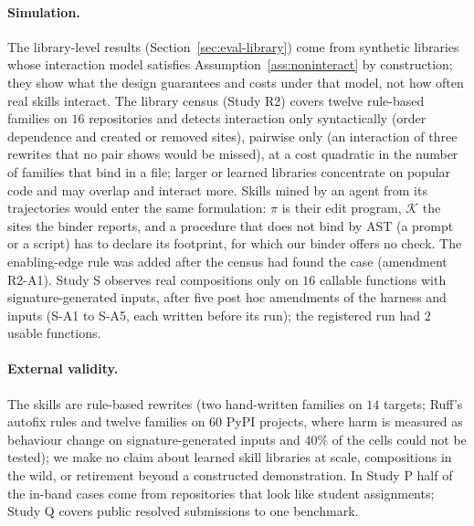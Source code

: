 \paragraph{Simulation.}
The library-level results (Section~\ref{sec:eval-library}) come from synthetic libraries whose interaction model satisfies
Assumption~\ref{ass:noninteract} by construction; they show what the design guarantees and costs under that model, not how often real
skills interact.  The library census (Study R2) covers twelve rule-based families on $16$ repositories and detects interaction only
syntactically (order dependence and created or removed sites), pairwise only (an interaction of three rewrites that no pair shows would be
missed), at a cost quadratic in the number of families that bind in a file; larger or learned libraries concentrate on popular code
and may overlap and interact more.  Skills mined by an agent from its trajectories would enter the same formulation: $\pi$ is
their edit program, $\mathcal{K}$ the sites the binder reports, and a procedure that does not bind by AST (a prompt or a script)
has to declare its footprint, for which our binder offers no check.  The enabling-edge rule was added after the census had found the case (amendment R2-A1).  Study S observes real compositions only
on $16$ callable functions with signature-generated inputs, after five post hoc amendments of the harness and inputs
(S-A1 to S-A5, each written before its run); the registered run had $2$ usable functions.

\paragraph{External validity.}
The skills are rule-based rewrites (two hand-written families on $14$ targets; Ruff's autofix rules and twelve families on $60$
PyPI projects, where harm is measured as behaviour change on signature-generated inputs and $40\%$ of the cells could not be
tested); we make no claim about learned skill libraries at scale,
compositions in the wild, or retirement beyond a constructed demonstration.  In Study P half of the in-band cases come from repositories
that look like student assignments; Study Q covers public resolved submissions to one benchmark.
